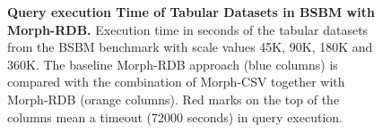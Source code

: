 \begin{figure}[th]

  \centering
  \qquad
\caption[Query execution Time in BSBM with Morph-RDB]{\textbf{Query execution Time of Tabular Datasets in BSBM with Morph-RDB.} Execution time in seconds of the tabular datasets from the BSBM benchmark with scale values 45K, 90K, 180K and 360K. The baseline Morph-RDB approach (blue columns) is compared with the combination of Morph-CSV together with Morph-RDB (orange columns). Red marks on the top of the columns mean a timeout (72000 seconds) in query execution.}
\label{fig:morphbsbm}
\end{figure}


